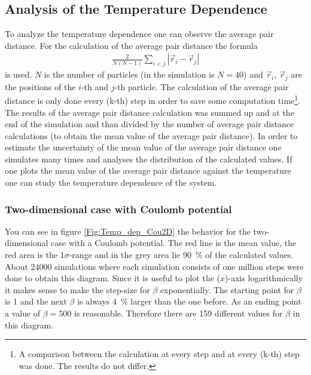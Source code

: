 \documentclass[11pt, a4paper]{article}
\numberwithin{equation}{section}
\newcommand{\remark}[1]{{\color{red}(#1)}}
\begin{document}
\subsection{Analysis of the Temperature Dependence} \label{sec:Temp_Dep}
To analyze the temperature dependence one can observe the average pair distance.
For the calculation of the average pair distance the formula
\begin{align*}
\frac{2}{N(N - 1)} \sum_{i<j} |\vec{r}_i - \vec{r}_j |
\end{align*}
is used.
$N$ is the number of particles (in the simulation is $N=40$) and $\vec{r}_i$, $\vec{r}_j$ are the positions of the $i$-th and $j$-th particle.
The calculation of the average pair distance is only done every \remark{k-th} step in order to save some computation time\footnote{A comparison between the calculation at every step and at every \remark{k-th} step was done.
The results do not differ.}.
The results of the average pair distance calculation was summed up and at the end of the simulation and than divided by the number of average pair distance calculations (to obtain the mean value of the average pair distance).
In order to estimate the uncertainty of the mean value of the average pair distance one simulates many times and analyses the distribution of the calculated values.
If one plots the mean value of the average pair distance against the temperature one can study the temperature dependence of the system.

\subsubsection{Two-dimensional case with Coulomb potential} \label{sec:2d_coulomb_tempdep}
You can see in figure \ref{Fig:Temp_dep_Cou2D} the behavior for the two-dimensional case with a Coulomb potential.
The red line is the mean value, the red area is the 1$\sigma$-range and in the grey area lie \SI{90}{\percent} of the calculated values.
About 24000 simulations where each simulation consists of one million steps were done to obtain this diagram.
Since it is useful to plot the \remark{$x$}-axis logarithmically it makes sense to make the step-size for $\beta$ exponentially.
The starting point for $\beta$ is 1 and the next $\beta$ is always \SI{4}{\percent} larger than the one before.
As an ending point a value of $\beta=500$ is reasonable.
Therefore there are 159 different values for $\beta$ in this diagram.
\end{document}
